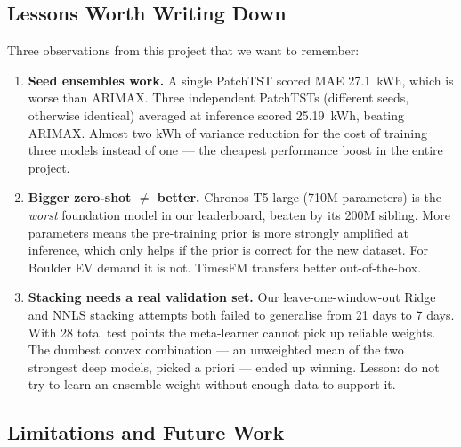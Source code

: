 \subsection{Lessons Worth Writing Down}

Three observations from this project that we want to remember:
\begin{enumerate}[leftmargin=*]
    \item \textbf{Seed ensembles work.} A single PatchTST scored
    MAE 27.1~kWh, which is worse than ARIMAX. Three independent
    PatchTSTs (different seeds, otherwise identical) averaged at
    inference scored 25.19~kWh, beating ARIMAX. Almost two kWh of
    variance reduction for the cost of training three models instead
    of one --- the cheapest performance boost in the entire project.
    \item \textbf{Bigger zero-shot $\neq$ better.} Chronos-T5 large
    (710M parameters) is the \emph{worst} foundation model in our
    leaderboard, beaten by its 200M sibling. More parameters means
    the pre-training prior is more strongly amplified at inference,
    which only helps if the prior is correct for the new dataset.
    For Boulder EV demand it is not. TimesFM transfers better
    out-of-the-box.
    \item \textbf{Stacking needs a real validation set.} Our
    leave-one-window-out Ridge and NNLS stacking attempts both failed
    to generalise from 21 days to 7 days. With 28 total test points
    the meta-learner cannot pick up reliable weights. The dumbest
    convex combination --- an unweighted mean of the two strongest
    deep models, picked a priori --- ended up winning. Lesson: do not
    try to learn an ensemble weight without enough data to support
    it.
\end{enumerate}

\subsection{Limitations and Future Work}


